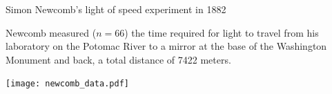 \documentclass[finnish,english,t]{beamer}
\begin{document}
\begin{frame}
  
  {\large\color{navyblue} Simon Newcomb's light of speed experiment in 1882}

  {\small
  Newcomb measured ($n=66$) the time required for light to travel from
  his laboratory on the Potomac River to a mirror at the base of the
  Washington Monument and back, a total distance of 7422 meters.}
  \begin{center}
    \vspace{-0.5\baselineskip}
    {\texttt{[image: newcomb\_data.pdf]}}\\
    \vspace{-1\baselineskip}
  \end{center}

\end{frame}








\end{document}
